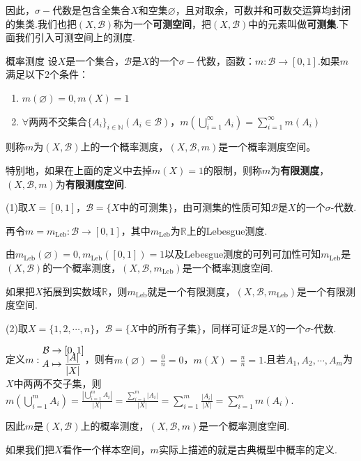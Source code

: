 \documentclass[lang=cn,a4paper,11pt,openany,scheme=chinese,twoside]{elegantbook}
\newcommand{\wideline}{\setlength{\lineskip}{\baselineskip-\ccwd}\setlength{\lineskiplimit}{2.5pt}}
\newcommand{\bluebf}[1]{\textcolor{structurecolor}{\textbf{#1}}}
\begin{document}
因此，$\sigma-$代数是包含全集合$X$和空集$\varnothing$，且对取余，可数并和可数交运算均封闭的集类.我们也把$(X,\mathcal{B})$称为一个\bluebf{可测空间}，把$(X,\mathcal{B})$中的元素叫做\bluebf{可测集}.下面我们引入可测空间上的测度.

\begin{definition}{概率测度}
    \wideline
    设$X$是一个集合，$\mathcal{B}$是$X$的一个$\sigma-\text{代数}$，函数：$m:\mathcal{B}\rightarrow[0,1]$.如果$m$满足以下2个条件：

    \begin{enumerate}
        \item $m(\varnothing)=0,m(X)=1$
        \item $\forall$两两不交集合$\{A_i\}_{i\in\mathbb{N}}(A_i\in\mathcal{B})$，$m\left(\bigcup_{i=1}^{\infty}{A_i}\right)=\sum_{i=1}^{\infty}{m(A_i)}$
    \end{enumerate}
    则称$m$为$(X,\mathcal{B})$上的一个概率测度，$(X,\mathcal{B},m)$是一个概率测度空间。
\end{definition}
特别地，如果在上面的定义中去掉$m(X)=1$的限制，则称$m$为\bluebf{有限测度}，$(X,\mathcal{B},m)$为\bluebf{有限测度空间}.

\begin{instance}
    (1)取$X=[0,1]$，$\mathcal{B}=\{X\text{中的可测集}\}$，由可测集的性质可知$\mathcal{B}$是$X$的一个$\sigma$-代数.\par

    再令$m=m_{\mathrm{Leb}}:\mathcal{B}\rightarrow [0,1]$，其中$m_{\mathrm{Leb}}$为$\mathbb{R}$上的Lebesgue测度.\par
    由$m_{\mathrm{Leb}}(\varnothing)=0,m_{\mathrm{Leb}}([0,1])=1$以及Lebesgue测度的可列可加性可知$m_{\mathrm{Leb}}$是$(X,\mathcal{B})$的一个概率测度，$(X,\mathcal{B},m_{\mathrm{Leb}})$是一个概率测度空间.\par
    如果把$X$拓展到实数域$\mathbb{R}$，则$m_{\mathrm{Leb}}$就是一个有限测度，$(X,\mathcal{B},m_{\mathrm{Leb}})$是一个有限测度空间.\par
    (2)取$X=\{1,2,\cdots,n\}$，$\mathcal{B}=\{X\text{中的所有子集}\}$，同样可证$\mathcal{B}$是$X$的一个$\sigma$-代数.\par
    定义$m:{\setlength{\jot}{-0.5em}\begin{aligned}
        \mathcal{B}&\to [0,1]\\
        A&\mapsto \frac{|A|}{|X|}
    \end{aligned}}$，则有$m(\varnothing)=\frac{0}{n}=0$，$m(X)=\frac{n}{n}=1$.且若$A_1,A_2,\cdots,A_m$为$X$中两两不交子集，则$m\left(\bigcup_{i=1}^m{A_i}\right)=\frac{\left|\displaystyle\bigcup_{i=1}^m{A_i}\right|}{|X|}=\frac{\displaystyle\sum_{i=1}^m{|A_i|}}{|X|}=\sum_{i=1}^m{\frac{|A_i|}{|X|}}=\sum_{i=1}^m{m(A_i)}$.\par
    因此$m$是$(X,\mathcal{B})$上的概率测度，$(X,\mathcal{B},m)$是一个概率测度空间.\par
    如果我们把$X$看作一个样本空间，$m$实际上描述的就是古典概型中概率的定义.
\end{instance}
\end{document}
